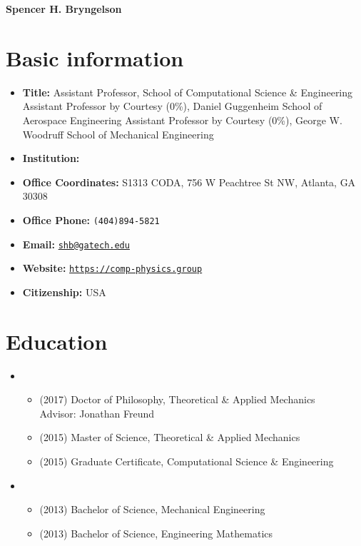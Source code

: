 




\begin{center}
    {\LARGE \bf Spencer H. Bryngelson} 
\end{center}


\section{Basic information}
\begin{itemize}
    \item[] \textbf{Title:} Assistant Professor, School of Computational Science \& Engineering \\
         Assistant Professor by Courtesy (0\%), Daniel Guggenheim School of Aerospace Engineering 
         Assistant Professor by Courtesy (0\%), George W. Woodruff School of Mechanical Engineering
    \item[] \textbf{Institution:} \GIT
    \item[] \textbf{Office Coordinates:} S1313 CODA, 756 W Peachtree St NW, Atlanta, GA 30308
    \item[] \textbf{Office Phone:} \texttt{(404)894-5821}
    \item[] \textbf{Email:} \href{mailto:shb@gatech.edu}{\texttt{shb@gatech.edu}}
    \item[] \textbf{Website:} \href{https://comp-physics.group}{\texttt{https://comp-physics.group}}
    \item[] \textbf{Citizenship:} USA
\end{itemize}

\section{Education}

\begin{itemize}
    \item \UIUC
    \begin{itemize}
        \item[] (2017) Doctor of Philosophy, Theoretical \& Applied Mechanics \\
            \phantom{(2017)} Advisor: Jonathan Freund
        \item[] (2015) Master of Science, Theoretical \& Applied Mechanics
        \item[] (2015) Graduate Certificate, Computational Science \& Engineering
    \end{itemize}
    \item \UMD
    \begin{itemize}
        \item[] (2013) Bachelor of Science, Mechanical Engineering
        \item[] (2013) Bachelor of Science, Engineering Mathematics
    \end{itemize}
\end{itemize}


